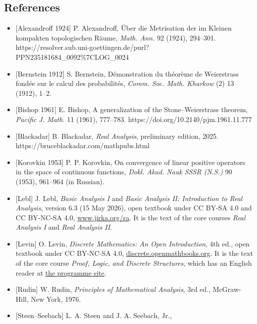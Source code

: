 \documentclass[
  english,
  11pt,
  a4paper,
]{article}
\providecommand{\tightlist}{%
  \setlength{\itemsep}{0pt}\setlength{\parskip}{0pt}}
\begin{document}
\subsection{References}\label{the-stone-weierstrass-theorem-for-functions-vanishing-at-infinity--references}

\begin{itemize}
\tightlist
\item
  {[}Alexandroff 1924{]} P. Alexandroff, Über die Metrisation der im
  Kleinen kompakten topologischen Räume, \emph{Math. Ann.} 92 (1924),
  294--301.
  https://resolver.sub.uni-goettingen.de/purl?PPN235181684\_0092\%7CLOG\_0024
\item
  {[}Bernstein 1912{]} S. Bernstein, Démonstration du théorème de
  Weierstrass fondée sur le calcul des probabilités, \emph{Comm. Soc.
  Math. Kharkow} (2) 13 (1912), 1--2.
\item
  {[}Bishop 1961{]} E. Bishop, A generalization of the
  Stone--Weierstrass theorem, \emph{Pacific J. Math.} 11 (1961),
  777--783. https://doi.org/10.2140/pjm.1961.11.777
\item
  {[}Blackadar{]} B. Blackadar, \emph{Real Analysis}, preliminary
  edition, 2025. https://bruceblackadar.com/mathpubs.html
\item
  {[}Korovkin 1953{]} P. P. Korovkin, On convergence of linear positive
  operators in the space of continuous functions, \emph{Dokl. Akad. Nauk
  SSSR (N.S.)} 90 (1953), 961--964 (in Russian).
\item
  {[}Lebl{]} J. Lebl, \emph{Basic Analysis I} and \emph{Basic Analysis
  II: Introduction to Real Analysis}, version 6.3 (15 May 2026), open
  textbook under CC BY-SA 4.0 and CC BY-NC-SA 4.0,
  \href{https://www.jirka.org/ra/}{www.jirka.org/ra}. It is the text of
  the core courses \emph{Real Analysis I} and \emph{Real Analysis II}.
\item
  {[}Levin{]} O. Levin, \emph{Discrete Mathematics: An Open
  Introduction}, 4th ed., open textbook under CC BY-NC-SA 4.0,
  \href{https://discrete.openmathbooks.org/dmoi4/}{discrete.openmathbooks.org}.
  It is the text of the core course \emph{Proof, Logic, and Discrete
  Structures}, which has an English reader at
  \href{https://kokunoyumeto.github.io/program-matematika-indonesia/en/courses/B10/reader/}{the
  programme site}.
\item
  {[}Rudin{]} W. Rudin, \emph{Principles of Mathematical Analysis}, 3rd
  ed., McGraw-Hill, New York, 1976.
\item
  {[}Steen--Seebach{]} L. A. Steen and J. A. Seebach, Jr.,

\end{itemize}
\end{document}
